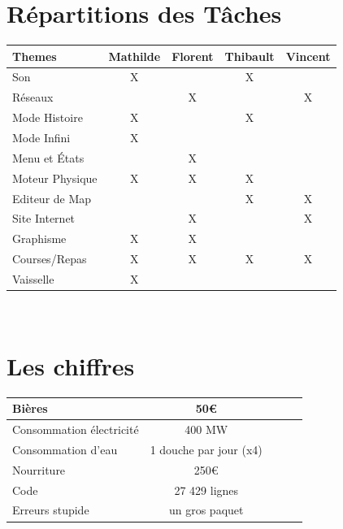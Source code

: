 \documentclass [11pt]{report}
\begin{document}
	
\newpage
	\section{Répartitions des Tâches}
	\vspace{8mm}
	\begin{center}
			\begin{tabular}{| l |*{4} {c|}}
				\hline
				Themes  & Mathilde & Florent & Thibault & Vincent \\
				\hline
				Son     & X &         & X    &        \\
				\hline
				Réseaux       &     & X       &       & X     \\
				\hline
				Mode Histoire     & X &     & X      &       \\
				\hline
				Mode Infini         & X &      &     &          \\
				\hline
				Menu et \'Etats        &  & X    &  &          \\
								\hline
				Moteur Physique & X      & X        & X &           \\
				\hline
				Editeur de Map &     &       & X     &  X\\
				\hline
				Site Internet  &    & X &     &  X       \\
				\hline
				Graphisme      & X  &  X  &         &\\
				\hline
				Courses/Repas      & X  &  X  &  X  & X\\
				\hline
				Vaisselle      & X  &     &         &\\
				\hline
				
			\end{tabular}\\\vspace{3mm}
	\end{center}
	
	\vspace{10mm}
	
	\section{Les chiffres}
	\vspace{8mm}
		\begin{center}
				\begin{tabular}{| l |*{4} {c|}}
				\hline
				Bières & 50€ \\
				\hline
				Consommation électricité & 400 MW  \\
				\hline
				Consommation d'eau & 1 douche par jour (x4)  \\
				\hline
				Nourriture & 250€ \\
				\hline
				Code & 27 429 lignes  \\
				\hline
				Erreurs stupide & un gros paquet  \\
				\hline
					
				\end{tabular}\\\vspace{3mm}
		\end{center}
	
\end{document}
